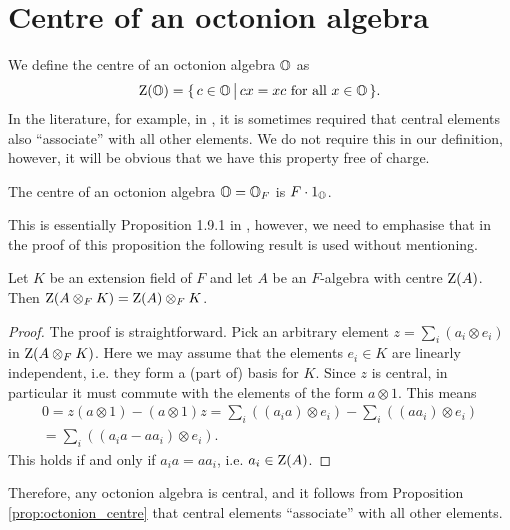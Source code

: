 \section{Centre of an octonion algebra}

We define the centre of an octonion algebra $\mathbb{O}$ as
\begin{equation}
	\label{eq:octonion_centre}
	\mathord{\mathrm{Z}}(\mathbb{O}) = \{\,c \in \mathbb{O}\,\big|\, cx = xc\ \mbox{for all}\ x \in \mathbb{O}\,\}.
\end{equation}
In the literature, for example, in \cite{Schafer}, it is sometimes required that central 
elements also ``associate'' with all other elements. We do not require this in our definition,
however, it will be obvious that we have this property free of charge. 

\begin{proposition}
	\label{prop:octonion_centre}
	The centre of an octonion algebra $\mathbb{O}=\mathbb{O}_F$ is $F\cdot 1_{\mathbb{O}}$.  
\end{proposition}

This is essentially Proposition 1.9.1 in \cite{SpringerVeldkamp}, however, we need to emphasise
that in the proof of this proposition the following result is used without mentioning.

\begin{lemma}
	Let $K$ be an extension field of $F$ and let $A$ be an $F$-algebra with centre $\mathord{\mathrm{Z}}(A)$.
	Then $\mathord{\mathrm{Z}}(A\otimes_F K) = \mathord{\mathrm{Z}}(A)\otimes_F K$. 
\end{lemma}

\begin{proof}
	The proof is straightforward. Pick an arbitrary element $z = \sum_i (a_i \otimes e_i)$ in
	$\mathord{\mathrm{Z}}(A\otimes_F K)$. Here we may assume that the elements $e_i \in K$ are linearly 
	independent, i.e. they form a (part of) basis for $K$. Since $z$ is central, in particular it 
	must commute with the elements of the form $a \otimes 1$. This means
	\begin{align*}
		0 = z (a \otimes 1) - (a\otimes 1) z = \sum_i ( (a_i a) \otimes e_i )
			- \sum_i( (a a_i) \otimes e_i ) \\
		= \sum_i ( (a_i a - a a_i) \otimes e_i ). 
	\end{align*}
	This holds if and only if $a_i a = a a_i$, i.e. $a_i \in \mathord{\mathrm{Z}}(A)$. 
\end{proof}

Therefore, any octonion algebra is central, and it follows from Proposition 
\ref{prop:octonion_centre} that central elements
``associate'' with all other elements.

